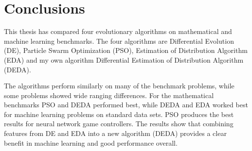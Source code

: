 \section{Conclusions}

This thesis has compared four evolutionary algorithms on mathematical and machine learning benchmarks. The four algorithms are Differential Evolution (DE), Particle Swarm Optimization (PSO), Estimation of Distribution Algorithm (EDA) and my own algorithm Differential Estimation of Distribution Algorithm (DEDA).

The algorithms perform similarly on many of the benchmark problems, while some problems showed wide ranging differences. For the mathematical benchmarks PSO and DEDA performed best, while DEDA and EDA worked best for machine learning problems on standard data sets. PSO produces the best results for neural network game controllers. The results show that combining features from DE and EDA into a new algorithm (DEDA) provides a clear benefit in machine learning and good performance overall.
